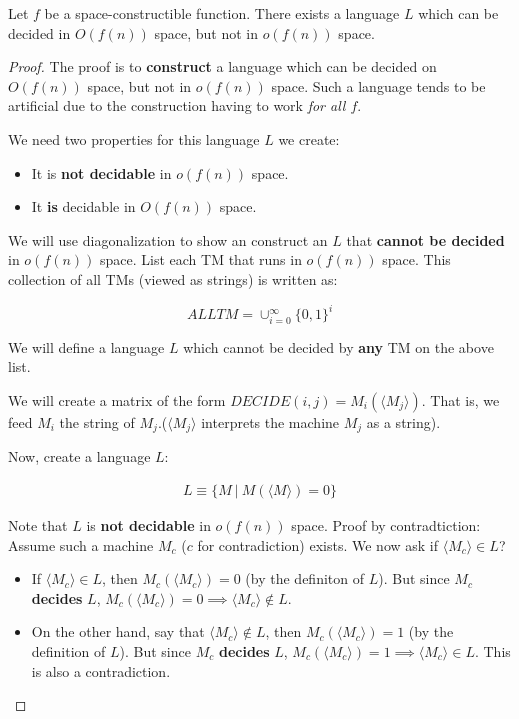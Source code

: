 \begin{theorem}
Let $f$ be a space-constructible function. There exists a language $L$ which
can be decided in $O(f(n))$ space, but not in $o(f(n))$ space.
\end{theorem}
\begin{proof}
The proof is to \textbf{construct} a language which can be decided on $O(f(n))$
space, but not in $o(f(n))$ space. Such a language tends to be artificial due
to the construction having to work \textit{for all $f$}.

We need two properties for this language $L$ we create:

\begin{itemize}
\item It is \textbf{not decidable} in $o(f(n))$ space.
\item It \textbf{is} decidable in $O(f(n))$ space.
\end{itemize}

We will use diagonalization to show an construct an $L$ that 
\textbf{cannot be decided} in $o(f(n))$ space. List each TM that runs in 
$o(f(n))$ space. This collection of all TMs (viewed as strings) is written as:

$$ALLTM = \cup_{i=0}^\infty \{0, 1\}^i$$


We will define a language $L$ which cannot be decided by \textbf{any} TM
on the above list.

We will create a matrix of the form $DECIDE(i, j) = M_i(\langle M_j \rangle)$.
That is, we feed $M_i$ the string of $M_j$.($\langle M_j \rangle$ interprets
the machine $M_j$ as a string).

Now, create a language $L$:

\begin{align*}
L \equiv \{ M~\vert~M ( \langle M \rangle ) = 0 \}
\end{align*}

Note that $L$ is \textbf{not decidable} in $o(f(n))$ space. Proof by contradtiction:
Assume such a machine $M_c$ ($c$ for contradiction) exists. We now ask if $\langle M_c \rangle \in L$?

\begin{itemize}
\item If $\langle M_c \rangle \in L$, then $M_c (\langle M_c \rangle) = 0$ (by the definiton of $L$).
But since $M_c$ \textbf{decides} $L$,
$M_c (\langle M_c \rangle) = 0 \implies  \langle M_c \rangle \notin L$.

\item On the other hand, say that $\langle M_c \rangle \notin L$, then $M_c (\langle M_c \rangle) = 1$
(by the definition of $L$).
But since $M_c$ \textbf{decides} $L$, $M_c (\langle M_c \rangle) = 1 \implies \langle M_c \rangle \in L$. This is also a contradiction.
\end{itemize}



\end{proof}
